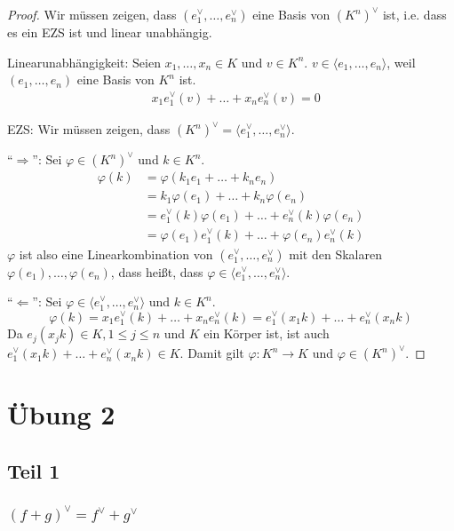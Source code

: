 \documentclass[a4paper,10pt]{article}
\begin{document}
\begin{proof}
 Wir müssen zeigen, dass $(e_1^\vee, \dots, e_n^\vee)$ eine Basis von $(K^n)^\vee$ ist, i.e. dass es ein EZS ist und linear unabhängig.
 
 Linearunabhängigkeit: Seien $x_1, \dots, x_n \in K$ und $v \in K^n$.
 $v \in \langle e_1, \dots, e_n \rangle$, weil $(e_1, \dots, e_n)$ eine Basis von $K^n$ ist.
 \begin{align}
  & x_1e_1^\vee(v) + \dots + x_ne_n^\vee(v) = 0
 \end{align}

 EZS: Wir müssen zeigen, dass $(K^n)^\vee = \langle e_1^\vee, \dots, e_n^\vee \rangle$.
 
 ``$\Rightarrow$'': Sei $\varphi \in (K^n)^\vee$ und $k \in K^n$.
 \begin{align}
  \varphi(k) & = \varphi(k_1e_1 + \dots + k_ne_n)\\
  & = k_1\varphi(e_1) + \dots + k_n\varphi(e_n)\\
  & = e_1^\vee(k)\varphi(e_1) + \dots + e_n^\vee(k)\varphi(e_n)\\
  & = \varphi(e_1)e_1^\vee(k) + \dots + \varphi(e_n)e_n^\vee(k)
 \end{align}
 $\varphi$ ist also eine Linearkombination von $(e_1^\vee, \dots, e_n^\vee)$ mit den Skalaren $\varphi(e_1), \dots, \varphi(e_n)$, dass heißt, dass $\varphi \in \langle e_1^\vee, \dots, e_n^\vee \rangle$.
 
 ``$\Leftarrow$'': Sei $\varphi \in \langle e_1^\vee, \dots, e_n^\vee \rangle$ und $k \in K^n$.
 \begin{equation}
  \varphi(k) = x_1e_1^\vee(k) + \dots + x_ne_n^\vee(k) = e_1^\vee(x_1k) + \dots + e_n^\vee(x_nk)
 \end{equation}
 Da $e_j(x_jk) \in K, 1 \le j \le n$ und $K$ ein Körper ist, ist auch $e_1^\vee(x_1k) + \dots + e_n^\vee(x_nk) \in K$.
 Damit gilt $\varphi: K^n \rightarrow K$ und $\varphi \in (K^n)^\vee$.
\end{proof}

\section*{Übung 2}

\subsection*{Teil 1}

\subsubsection*{$(f + g)^\vee = f^\vee + g^\vee$}
\end{document}
